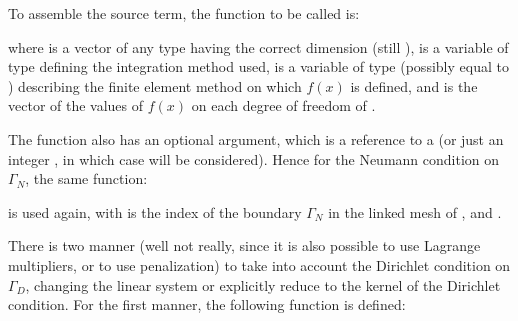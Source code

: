 \documentclass[a4paper,11pt,english]{sphinxmanual}
\begin{document}
To assemble the source term, the function to be called is:

\begin{sphinxVerbatim}[commandchars=\\\{\}]
    
\end{sphinxVerbatim}

where  is a vector of any type having the correct dimension (still
),  is a variable of type  defining the integration
method used,  is a variable of type  (possibly equal to )
describing the finite element method on which \(f(x)\) is defined, and 
is the vector of the values of \(f(x)\) on each degree of freedom of .

The function  also has an optional argument, which is a
reference to a  (or just an integer , in which case
 will be considered). Hence for the Neumann
condition on \(\Gamma_{N}\), the same function:

\begin{sphinxVerbatim}[commandchars=\\\{\}]
     
\end{sphinxVerbatim}

is used again, with  is the index of the boundary \(\Gamma_{N}\) in
the linked mesh of ,  and .

There is two manner (well not really, since it is also possible to use Lagrange
multipliers, or to use penalization) to take into account the Dirichlet condition
on \(\Gamma_{D}\), changing the linear system or explicitly reduce to the
kernel of the Dirichlet condition. For the first manner, the following function is
defined:
\end{document}
